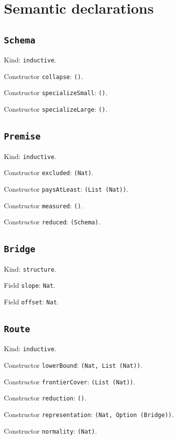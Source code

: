 \documentclass[11pt]{article}
\begin{document}
\section*{Semantic declarations}
\subsection*{\texttt{Schema}}
\noindent Kind: \texttt{inductive}.\par
\noindent Constructor \texttt{collapse}: \texttt{()}.\par
\noindent Constructor \texttt{specializeSmall}: \texttt{()}.\par
\noindent Constructor \texttt{specializeLarge}: \texttt{()}.\par
\subsection*{\texttt{Premise}}
\noindent Kind: \texttt{inductive}.\par
\noindent Constructor \texttt{excluded}: \texttt{(Nat)}.\par
\noindent Constructor \texttt{paysAtLeast}: \texttt{(List (Nat))}.\par
\noindent Constructor \texttt{measured}: \texttt{()}.\par
\noindent Constructor \texttt{reduced}: \texttt{(Schema)}.\par
\subsection*{\texttt{Bridge}}
\noindent Kind: \texttt{structure}.\par
\noindent Field \texttt{slope}: \texttt{Nat}.\par
\noindent Field \texttt{offset}: \texttt{Nat}.\par
\subsection*{\texttt{Route}}
\noindent Kind: \texttt{inductive}.\par
\noindent Constructor \texttt{lowerBound}: \texttt{(Nat, List (Nat))}.\par
\noindent Constructor \texttt{frontierCover}: \texttt{(List (Nat))}.\par
\noindent Constructor \texttt{reduction}: \texttt{()}.\par
\noindent Constructor \texttt{representation}: \texttt{(Nat, Option (Bridge))}.\par
\noindent Constructor \texttt{normality}: \texttt{(Nat)}.\par
\end{document}
